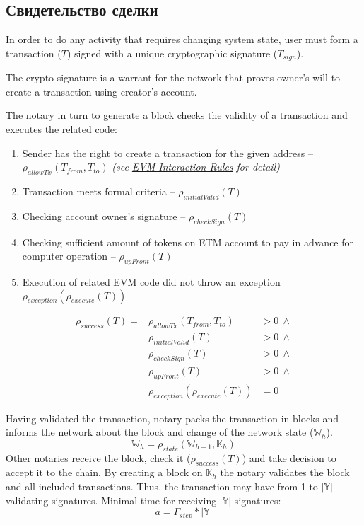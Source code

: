 \documentclass[12pt]{report}
\begin{document}
\subsection{Свидетельство сделки}
\label{tech-blockchain-confirmation}
\begin{multicols}{2}
In order to do any activity that requires changing system state, user must form a transaction ($T$) signed with a unique cryptographic signature ($T_{sign}$). 

The crypto-signature is a warrant for the network that proves owner's will to create a transaction using creator's account. 

The notary in turn to generate a block checks the validity of a transaction and executes the related code:
\begin{enumerate}
\item Sender has the right to create a transaction for the given address – $\rho_{allowTx}(T_{from}, T_{to})$ \textit{(see \hyperref[tech-blockchain-rules]{EVM Interaction Rules} for detail)}
\item Transaction meets formal criteria – $\rho_{initialValid}(T)$
\item Checking account owner's signature – $\rho_{checkSign}(T)$
\item Checking sufficient amount of tokens on ETM account to pay in advance for computer operation – $\rho_{upFront}(T)$
\item Execution of related	EVM code	did not 	throw an exception $\rho_{exception}(\rho_{execute}(T))$
\end{enumerate}
\end{multicols}
\begin{align}
\rho_{success}(T) = 	&\rho_{allowTx}(T_{from}, T_{to}) &> 0 \ \wedge \\
 								&\rho_{initialValid}(T) &> 0 \ \wedge \\
								&\rho_{checkSign}(T) &> 0 \ \wedge \\
								&\rho_{upFront}(T) &> 0 \ \wedge \\
 								&\rho_{exception}(\rho_{execute}(T)) &= 0
\end{align}
\begin{multicols}{2}
Having validated the transaction, notary packs the transaction in blocks and informs the network about the block and change of the network state ($\mathbb{W}_h$).
\begin{equation}
\mathbb{W}_h = \rho_{state}(\mathbb{W}_{h-1}, \mathbb{K}_h)
\end{equation}
Other notaries receive the block, check it ($\rho_{success}(T)$) and take decision to accept it to the chain. By creating a block on $\mathbb{K}_h$ the notary validates the block and all included transactions.
Thus, the transaction may have from 1 to $|\mathbb{Y}|$ validating signatures.
Minimal time for receiving $|\mathbb{Y}|$ signatures:
\begin{equation}
a = \Gamma_{step} * |\mathbb{Y}|
\end{equation}
\end{multicols}
\end{document}
